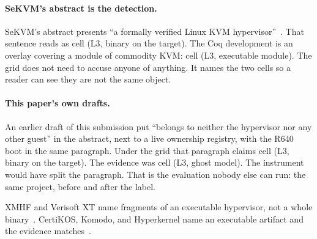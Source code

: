 \documentclass[sigplan,10pt,anonymous]{acmart}
\begin{document}
\paragraph{SeKVM's abstract is the detection.}
SeKVM's abstract presents ``a formally verified Linux KVM
hypervisor''~\cite{li2021varmour,li2021microhvisor}. That sentence reads as
cell (L3, binary on the target). The Coq development is an overlay covering
a module of commodity KVM: cell (L3, executable module). The grid does not
need to accuse anyone of anything. It names the two cells so a reader can
see they are not the same object.

\paragraph{This paper's own drafts.}
An earlier draft of this submission put ``belongs to neither the
hypervisor nor any other guest'' in the abstract, next to a live
ownership registry, with the R640 boot in the same paragraph. Under the
grid that paragraph claims cell (L3, binary on the target). The evidence
was cell (L3, ghost model). The instrument would have split the paragraph.
That is the evaluation nobody else can run: the same project, before and
after the label.

XMHF and Verisoft XT name fragments of an executable hypervisor, not a
whole binary~\cite{vasudevan2013xmhf,leinenbach2009verisoft}. CertiKOS,
Komodo, and Hyperkernel name an executable artifact and the evidence
matches~\cite{gu2016certikos,ferraiuolo2017komodo,nelson2017hyperkernel}.
\end{document}
